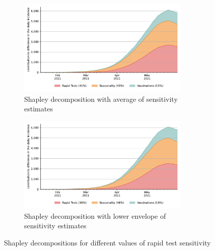 {\begin{figure}
        \begin{subfigure}[b]{0.475\textwidth}
            \centering
            \includegraphics[width=0.9\textwidth]{figures/results/figures/data/testing/full_decomposition_channels_area_average}
            \caption{Shapley decomposition with average of sensitivity estimates}
        \end{subfigure}
        \begin{subfigure}[b]{0.475\textwidth}
            \centering
            \includegraphics[width=0.9\textwidth]{figures/results/figures/data/testing/full_decomposition_channels_area_lower_envelope}
            \caption{Shapley decomposition with lower envelope of sensitivity estimates}
        \end{subfigure}

        \caption{Shapley decompositions for different values of rapid test sensitivity}
        \label{fig:robustness_to_sensitivity_assumptions}
    \end{figure}

}
\FloatBarrier
